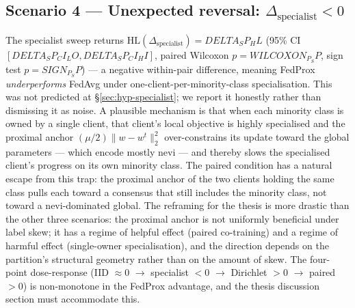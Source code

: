 \subsection*{Scenario 4 — Unexpected reversal:
$\Delta_{\mathrm{specialist}} < 0$}
The specialist sweep returns $\mathrm{HL}(\Delta_{\mathrm{specialist}}) =
{DELTA_SP_HL}$ (95\% CI $[{DELTA_SP_CI_LO}, {DELTA_SP_CI_HI}]$, paired
Wilcoxon $p = {WILCOXON_P_SP}$, sign test $p = {SIGN_P_SP}$) — a
negative within-pair difference, meaning FedProx \emph{underperforms}
FedAvg under one-client-per-minority-class specialisation. This was not
predicted at \S\ref{sec:hyp-specialist}; we report it honestly rather
than dismissing it as noise. A plausible mechanism is that when each
minority class is owned by a single client, that client's local
objective is highly specialised and the proximal anchor $(\mu/2)
\lVert w - w^t\rVert_2^2$ over-constrains its update toward the global
parameters --- which encode mostly nevi --- and thereby slows the
specialised client's progress on its own minority class. The paired
condition has a natural escape from this trap: the proximal anchor of
the two clients holding the same class pulls each toward a consensus
that still includes the minority class, not toward a nevi-dominated
global. The reframing for the thesis is more drastic than the other
three scenarios: the proximal anchor is not uniformly beneficial under
label skew; it has a regime of helpful effect (paired co-training) and
a regime of harmful effect (single-owner specialisation), and the
direction depends on the partition's structural geometry rather than
on the amount of skew. The four-point dose-response (IID $\approx 0$
$\to$ specialist $<0$ $\to$ Dirichlet $> 0$ $\to$ paired $> 0$) is
non-monotone in the FedProx advantage, and the thesis discussion
section must accommodate this.
